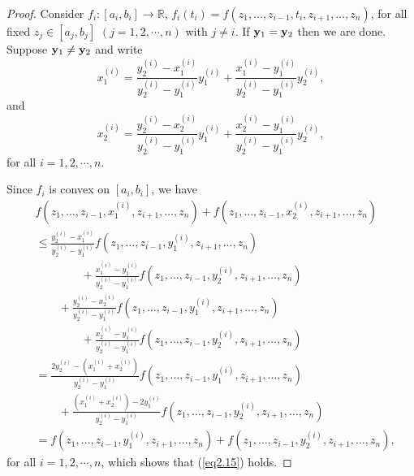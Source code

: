 \documentclass{amsart}
\theoremstyle{plain}
\numberwithin{equation}{section}
\begin{document}
\begin{proof}
Consider $ f_i :\left[ {a_i,b_i} \right] \to \mathbb{R} $, $ f_i
\left( {t_i}
 \right) =
f\left( {z_1 , \ldots ,z_{i - 1} ,t_i ,z_{i + 1} , \ldots ,z_n }
\right) $,  for all fixed $ z_j \in \left[ {a_j,b_j} \right] $
$(j=1,2,\cdots,n)$ with $j\ne i$. If ${\bf{y}}_1 = {\bf{y}}_2$
then we are done. Suppose ${\bf{y}}_1 \ne {\bf{y}}_2$ and write
$$x_1^{(i)}  = \frac{{y_2^{(i)}  - x_1^{(i)} }}{{y_2^{(i)}  -
y_1^{(i)} }}y_1^{(i)}  + \frac{{x_1^{(i)} - y_1^{(i)}
}}{{y_2^{(i)}  - y_1^{(i)} }}y_2^{(i)},$$and$$x_2^{(i)}  =
\frac{{y_2^{(i)}  - x_2^{(i)} }}{{y_2^{(i)} - y_1^{(i)}
}}y_1^{(i)}  + \frac{{x_2^{(i)}  - y_1^{(i)} }}{{y_2^{(i)} -
y_1^{(i)} }}y_2^{(i)},$$ for all $i=1,2,\cdots,n$.

Since $f_i$ is convex on $\left[ {a_i,b_i} \right] $, we have
\begin{align*}
&f\left( {z_1 , \ldots ,z_{i - 1} ,x_1^{\left( i \right)} ,z_{i +
1} , \ldots ,z_n } \right) + f\left( {z_1 , \ldots ,z_{i - 1}
,x_2^{\left( i \right)} ,z_{i + 1} , \ldots ,z_n } \right)
\\
&\le \frac{{y_2^{(i)}  - x_1^{(i)} }}{{y_2^{(i)}  - y_1^{(i)}
}}f\left( {z_1 , \ldots ,z_{i - 1} ,y_1^{\left( i \right)} ,z_{i +
1} , \ldots ,z_n } \right)
\\
&\qquad\qquad+ \frac{{x_1^{(i)} - y_1^{(i)} }}{{y_2^{(i)}  -
y_1^{(i)} }}f\left( {z_1 , \ldots ,z_{i - 1} ,y_2^{\left( i
\right)} ,z_{i + 1} , \ldots ,z_n } \right)
\\
&\qquad+ \frac{{y_2^{(i)}  - x_2^{(i)} }}{{y_2^{(i)} - y_1^{(i)}
}}f\left( {z_1 , \ldots ,z_{i - 1} ,y_1^{\left( i \right)} ,z_{i +
1} , \ldots ,z_n } \right)
\\
&\qquad\qquad+ \frac{{x_2^{(i)}  - y_1^{(i)} }}{{y_2^{(i)} -
y_1^{(i)} }}f\left( {z_1 , \ldots ,z_{i - 1} ,y_2^{\left( i
\right)} ,z_{i + 1} , \ldots ,z_n } \right)
\\
&= \frac{{2y_2^{(i)}   - \left( {x_1^{(i)}   + x_2^{(i)}  }
\right)}}{{y_2^{(i)}   - y_1^{(i)}  }}f\left( {z_1 , \ldots ,z_{i
- 1} ,y_1^{\left( i \right)} ,z_{i + 1} , \ldots ,z_n } \right)
\\
&\qquad+ \frac{{\left( {x_1^{(i)}   + x_2^{(i)}  } \right) -
2y_1^{(i)} }}{{y_2^{(i)}  - y_1^{(i)}  }}f\left( {z_1 , \ldots
,z_{i - 1} ,y_2^{\left( i \right)} ,z_{i + 1} , \ldots ,z_n }
\right)
\\
&= f\left( {z_1 , \ldots ,z_{i - 1} ,y_1^{\left( i \right)} ,z_{i
+ 1} , \ldots ,z_n } \right)+f\left( {z_1 , \ldots ,z_{i - 1}
,y_2^{\left( i \right)} ,z_{i + 1} , \ldots ,z_n } \right),
\end{align*}
for all $i=1,2,\cdots,n$, which shows that (\ref{eq2.15}) holds.
\end{proof}
\end{document}
